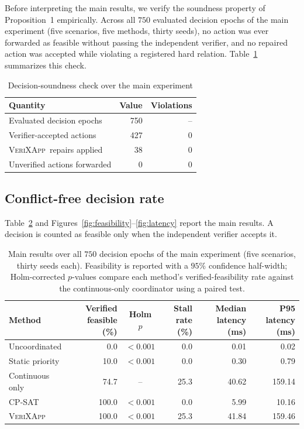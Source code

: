 \documentclass[pdflatex,sn-mathphys-num,iicol,oneside]{sn-jnl}
\newcommand{\method}{\textsc{VeriXApp}}
\begin{document}
Before interpreting the main results, we verify the soundness property of
Proposition~1 empirically. Across all $750$ evaluated decision epochs of the
main experiment (five scenarios, five methods, thirty seeds), no action was
ever forwarded as feasible without passing the independent verifier, and no
repaired action was accepted while violating a registered hard relation.
Table~\ref{tab:sanity} summarizes this check.

\begin{table}[t]
\centering
\caption{Decision-soundness check over the main experiment}
\label{tab:sanity}
\begin{tabular}{lrr}
\toprule
Quantity & Value & Violations\\
\midrule
Evaluated decision epochs & 750 & --\\
Verifier-accepted actions & 427 & 0\\
\method\ repairs applied & 38 & 0\\
Unverified actions forwarded & 0 & 0\\
\bottomrule
\end{tabular}
\end{table}

\subsection{Conflict-free decision rate}

Table~\ref{tab:main-results} and Figures~\ref{fig:feasibility}--\ref{fig:latency} report the main results. A decision is
counted as feasible only when the independent verifier accepts it.

\begin{table}[t]
\centering
\caption{
Main results over all $750$ decision epochs of the main experiment
(five scenarios, thirty seeds each). Feasibility is reported with a
$95\%$ confidence half-width; Holm-corrected $p$-values compare each
method's verified-feasibility rate against the continuous-only
coordinator using a paired test.
}
\label{tab:main-results}
\begin{tabular}{
l
r
c
r
r
r
}
\toprule
Method &
{Verified feasible (\%)} &
{Holm $p$} &
{Stall rate (\%)} &
{Median latency (ms)} &
{P95 latency (ms)}\\
\midrule
Uncoordinated &
{0.0} &
{$<0.001$} &
{0.0} &
{0.01} &
{0.02}\\

Static priority &
{10.0} &
{$<0.001$} &
{0.0} &
{0.30} &
{0.79}\\

Continuous only &
{74.7} &
{--} &
{25.3} &
{40.62} &
{159.14}\\

CP-SAT &
{100.0} &
{$<0.001$} &
{0.0} &
{5.99} &
{10.16}\\

\method &
{100.0} &
{$<0.001$} &
{25.3} &
{41.84} &
{159.46}\\

\bottomrule
\end{tabular}
\end{table}
\end{document}
